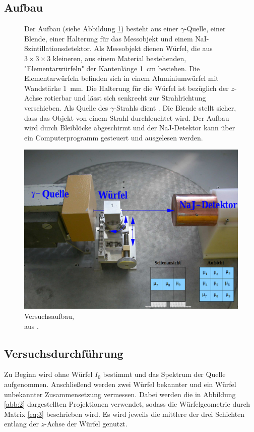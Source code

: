 \subsection{Aufbau}
\begin{figure}[h!]
  \begin{minipage}{0.6\textwidth}
    Der Aufbau (siehe Abbildung \ref{abb:1}) besteht aus einer $\gamma$-Quelle,
    einer Blende, einer Halterung für das Messobjekt und einem NaI-Szintillationsdetektor.
    Als Messobjekt dienen Würfel, die aus $3\times3\times3$ kleineren, aus einem Material
    bestehenden, "Elementarwürfeln" der Kantenlänge \SI{1}{\centi\metre} bestehen.
    Die Elementarwürfeln befinden sich in einem Aluminiumwürfel mit Wandstärke \SI{1}{\milli\metre}.
    Die Halterung für die Würfel ist bezüglich der $z$-Achse rotierbar und lässt sich senkrecht
    zur Strahlrichtung verschieben.
    Als Quelle des $\gamma$-Strahls dient .
    Die Blende stellt sicher, dass das Objekt von einem Strahl durchleuchtet wird.
    Der Aufbau wird durch Bleiblöcke abgeschirmt und der NaJ-Detektor kann über ein
    Computerprogramm gesteuert und ausgelesen werden.
  \end{minipage}
  \hfill
  \begin{minipage}{0.35\textwidth}
    \includegraphics[width=\textwidth]{content/pics/Aufbau.png}
    \caption{Versuchsaufbau, \\aus \cite{anleitung}.}
    \label{abb:1}
  \end{minipage}
\end{figure}


\subsection{Versuchsdurchführung}
Zu Beginn wird ohne Würfel $I_{0}$ bestimmt und das Spektrum der Quelle aufgenommen.
Anschließend werden zwei Würfel bekannter und ein Würfel unbekannter Zusammensetzung
vermessen.
Dabei werden die in Abbildung \ref{abb:2} dargestellten Projektionen verwendet,
sodass die Würfelgeometrie durch Matrix \eqref{eq:3} beschrieben wird.
Es wird jeweils die mittlere der drei Schichten entlang der $z$-Achse der Würfel genutzt.

